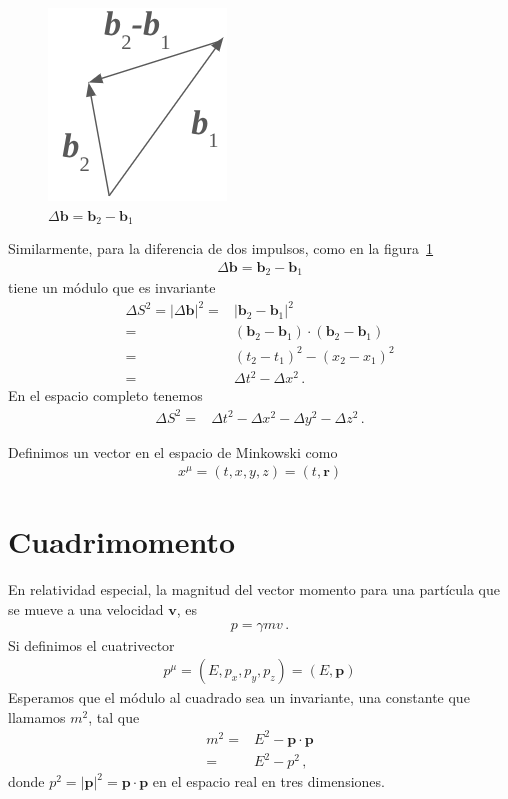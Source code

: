 \documentclass[11pt,a4paper]{article}
\begin{document}
\begin{figure}
    \centering
    \includegraphics[scale=0.5]{b2-b1.png}
    \caption{$\Delta\boldsymbol{b} = \boldsymbol{b}_2 - \boldsymbol{b}_1$}
    \label{fig:b2-b1}
\end{figure}

Similarmente, para la diferencia de dos impulsos, como en la figura~\ref{fig:b2-b1}
\begin{align*}
    \Delta\boldsymbol{b} = \boldsymbol{b}_2 - \boldsymbol{b}_1 
\end{align*}
tiene un módulo que es invariante
\begin{align*}
    \Delta S^2 = |\Delta\boldsymbol{b}|^2=& |\boldsymbol{b}_2 -\boldsymbol{b}_1 |^2\\
    =&(\boldsymbol{b}_2 -\boldsymbol{b}_1)\cdot (\boldsymbol{b}_2 -\boldsymbol{b}_1)  \\
=&\left(t_2-t_1\right)^2 -\left(x_2-x_1\right)^2\\
    = &\Delta t^2 - \Delta x^2\,. 
\end{align*}
En el espacio completo tenemos
\begin{align*}
    \Delta S^2 =
     &\Delta t^2 - \Delta x^2 - \Delta y^2 - \Delta z^2\,. 
\end{align*}

Definimos un vector en el espacio de Minkowski como
\begin{align*}
    x^\mu = (t,x,y,z) = (t,\boldsymbol{r})
\end{align*}

\section{Cuadrimomento}
En relatividad especial, la magnitud del vector momento para una partícula que se mueve a una velocidad $\boldsymbol{v}$, es
\begin{align*}
    p= \gamma m v\,.
\end{align*}
Si definimos el cuatrivector
\begin{align*}
    p^\mu = (E,p_x,p_y,p_z) = (E,\boldsymbol{p})
\end{align*}
Esperamos que el módulo al cuadrado sea un invariante, una constante que llamamos $m^2$, tal que
\begin{align*}
    m^2 =& E^2 - \boldsymbol{p}\cdot\boldsymbol{p} \\
        =&   E^2 -p^2\,,
\end{align*}
donde $p^2 = |\boldsymbol{p}|^2 =\boldsymbol{p}\cdot\boldsymbol{p} $ en el espacio real en tres dimensiones.
\end{document}
